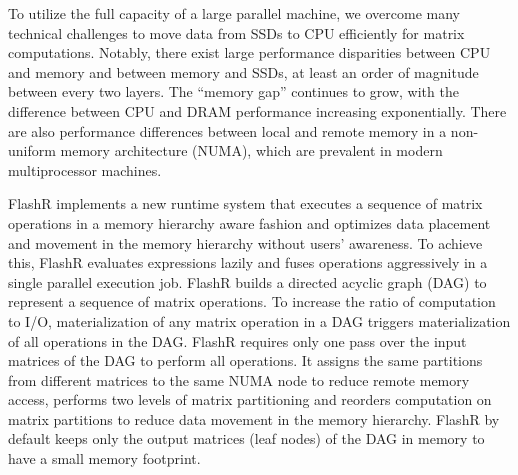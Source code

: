 
To utilize the full capacity of a large parallel machine, we overcome
many technical challenges to move data from SSDs to CPU efficiently for matrix
computations. Notably, there exist large performance disparities between CPU
and memory and between memory and SSDs, at least an order of magnitude between
every two layers. The ``memory gap'' \cite{Wilkes01} continues to grow, with
the difference between CPU and DRAM performance increasing exponentially.
There are also performance differences between
local and remote memory in a non-uniform memory architecture (NUMA), which are prevalent
in modern multiprocessor machines.


FlashR implements a new runtime system that executes a sequence of matrix
operations in a memory hierarchy aware fashion and optimizes
data placement and movement in the memory hierarchy without users' awareness.
To achieve this, FlashR evaluates expressions lazily and fuses operations
aggressively in a single parallel execution job. FlashR
builds a directed acyclic graph (DAG) to represent a sequence of matrix
operations. To increase the ratio of computation to I/O, materialization
of any matrix operation in a DAG triggers materialization of all operations
in the DAG. FlashR requires only one pass over the input matrices of
the DAG to perform all operations. It assigns the same partitions from
different matrices to the same NUMA node
to reduce remote memory access, performs two levels of matrix partitioning
and reorders computation on matrix partitions to reduce data movement
in the memory hierarchy. FlashR by default keeps only the output
matrices (leaf nodes) of the DAG in memory to have a small memory footprint.


